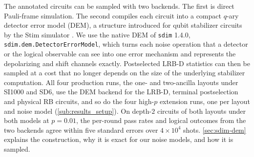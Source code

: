 The annotated circuits can be sampled with two backends. The first is direct Pauli-frame simulation. The second compiles each circuit into a compact $q$-ary detector error model (DEM), a structure introduced for qubit stabilizer circuits by the Stim simulator \cite{Gidney2021Stim}. We use the native DEM of \texttt{sdim} 1.4.0, \texttt{sdim.dem.DetectorErrorModel}, which turns each noise operation that a detector or the logical observable can see into one error mechanism and represents the depolarizing and shift channels exactly. Postselected LRB-D statistics can then be sampled at a cost that no longer depends on the size of the underlying stabilizer computation. All four production runs, the one- and two-ancilla layouts under SI1000 and SD6, use the DEM backend for the LRB-D, terminal postselection and physical RB circuits, and so do the four high-$p$ extension runs, one per layout and noise model (\autoref{sub:results_setup}). On depth-$2$ circuits of both layouts under both models at $p = 0.01$, the per-round pass rates and logical outcomes from the two backends agree within five standard errors over $4 \times 10^4$ shots. \autoref{sec:sdim-dem} explains the construction, why it is exact for our noise models, and how it is sampled.

